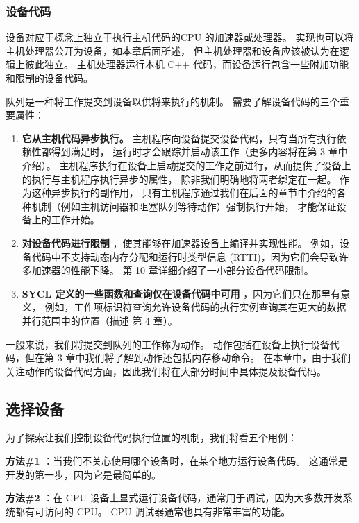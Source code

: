 \subsubsection{设备代码}
设备对应于概念上独立于执行主机代码的CPU 的加速器或处理器。 实现也可以将主机处理器公开为设备，如本章后面所述，
但主机处理器和设备应该被认为在逻辑上彼此独立。 
主机处理器运行本机 C++ 代码，而设备运行包含一些附加功能和限制的设备代码。

队列是一种将工作提交到设备以供将来执行的机制。 需要了解设备代码的三个重要属性：

\begin{enumerate}
	\item \textbf{它从主机代码异步执行。} 主机程序向设备提交设备代码，只有当所有执行依赖性都得到满足时，
	运行时才会跟踪并启动该工作（更多内容将在第 3 章中介绍）。 
	主机程序执行在设备上启动提交的工作之前进行，从而提供了设备上的执行与主机程序执行异步的属性，
	除非我们明确地将两者绑定在一起。 作为这种异步执行的副作用，
	只有主机程序通过我们在后面的章节中介绍的各种机制（例如主机访问器和阻塞队列等待动作）强制执行开始，
	才能保证设备上的工作开始。

	\item \textbf{对设备代码进行限制} ，使其能够在加速器设备上编译并实现性能。 
	例如，设备代码中不支持动态内存分配和运行时类型信息 (RTTI)，因为它们会导致许多加速器的性能下降。 
	第 10 章详细介绍了一小部分设备代码限制。

	\item \textbf{SYCL 定义的一些函数和查询仅在设备代码中可用} ，因为它们只在那里有意义，
	例如，工作项标识符查询允许设备代码的执行实例查询其在更大的数据并行范围中的位置（描述 第 4 章）。
\end{enumerate}

一般来说，我们将提交到队列的工作称为动作。 
动作包括在设备上执行设备代码，但在第 3 章中我们将了解到动作还包括内存移动命令。 
在本章中，由于我们关注动作的设备代码方面，因此我们将在大部分时间中具体提及设备代码。

\subsection{选择设备}
为了探索让我们控制设备代码执行位置的机制，我们将看五个用例：

\textbf{方法\#1} ：当我们不关心使用哪个设备时，在某个地方运行设备代码。 这通常是开发的第一步，因为它是最简单的。

\textbf{方法\#2} ：在 CPU 设备上显式运行设备代码，通常用于调试，因为大多数开发系统都有可访问的 CPU。 
CPU 调试器通常也具有非常丰富的功能。

